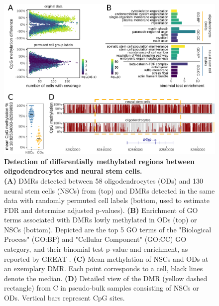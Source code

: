 \documentclass[10pt]{article}
\begin{document}
\begin{figure}[p]
	\begin{center}
		\includegraphics[width=.7\textwidth]{figures/Fig_DMRs.png}
	\end{center}
	\caption{\small \textbf{Detection of differentially methylated regions between oligodendrocytes and neural stem cells.}\\
		\textbf{(A)} DMRs detected between 58 oligodendrocytes (ODs) and 130 neural stem cells (NSCs) from \citet{kremer_scnmt} (top) and DMRs detected in the same data with randomly permuted cell labels (bottom, used to estimate FDR and determine adjusted p-values).
		\textbf{(B)} Enrichment of GO terms associated with DMRs lowly methylated in ODs (top) or NSCs (bottom).
		Depicted are the top 5 GO terms of the "Biological Process" (GO:BP) and "Cellular Component" (GO:CC) GO category, and their binomial test p-value and enrichment, as reported by GREAT \citep{mclean2010great}.
		\textbf{(C)} Mean methylation of NSCs and ODs at an exemplary DMR.
		Each point corresponds to a cell, black lines denote the median.
		\textbf{(D)} Detailed view of the DMR (yellow dashed rectangle) from C in pseudo-bulk samples consisting of NSCs or ODs.
		Vertical bars represent CpG sites.
	}
	\label{fig:dmr}
\end{figure}
\end{document}

